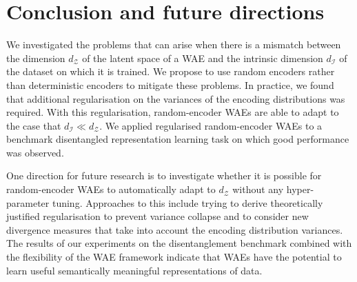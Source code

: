 \documentclass{article}
\def\dZ{d_{\mathcal{Z}}}
\def\dI{d_\mathcal{I}}
\begin{document}
\section{Conclusion and future directions}

We investigated the problems that can arise when there is a mismatch between the dimension $\dZ$ of the latent space of a WAE and the intrinsic dimension $\dI$ of the dataset on which it is trained. 
We propose to use random encoders rather than deterministic encoders to mitigate these problems.
In practice, we found that additional regularisation on the variances of the encoding distributions was required. 
With this regularisation, random-encoder WAEs are able to adapt to the case that $\dI \ll \dZ$.
We applied regularised random-encoder WAEs to a benchmark disentangled representation learning task on which good performance was observed.

One direction for future research is to investigate whether it is possible for random-encoder WAEs to automatically adapt to $\dZ$ without any hyper-parameter tuning. 
Approaches to this include trying to derive theoretically justified regularisation to prevent variance collapse and to consider new divergence measures that take into account the encoding distribution variances.
The results of our experiments on the disentanglement benchmark combined with the flexibility of the WAE framework indicate that WAEs have the potential to learn useful semantically meaningful representations of data.




\end{document}
